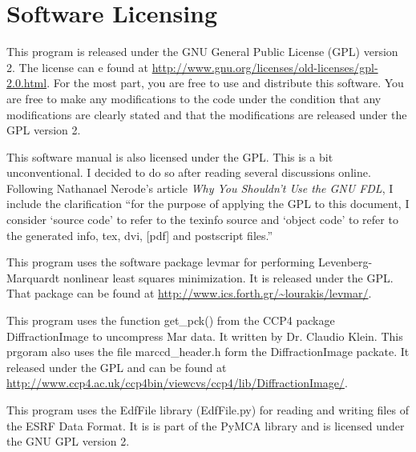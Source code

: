 \chapter{Software Licensing}

This program is released under the GNU General
Public License (GPL) version 2.
The license can e found at 
\url{http://www.gnu.org/licenses/old-licenses/gpl-2.0.html}.
For the most part, you are free to use and distribute 
this software. You are free to make any modifications to 
the code under the condition that any modifications are clearly 
stated and that the modifications are released under the 
GPL version 2.

This software manual is also licensed under the GPL. 
This is a bit unconventional. I decided to do so after reading
several discussions online. Following Nathanael Nerode's 
article {\em Why You Shouldn't Use the GNU FDL}, I include 
the clarification ``for the purpose of applying the GPL to 
this document, I consider `source code' to refer to the texinfo 
source and `object code' to refer to the generated info, tex, 
dvi, [pdf] and postscript files.''\cite{Nerode03}

This program uses the software package
levmar for performing Levenberg-Marquardt nonlinear
least squares minimization.
It is released under the GPL. That package can be 
found at \url{http://www.ics.forth.gr/~lourakis/levmar/}.\cite{lourakis04LM}

This program uses the function get\_pck() from the CCP4 package
DiffractionImage to uncompress Mar data. It
written by Dr. Claudio Klein.\cite{Klein95} 
This prgoram also uses the file marccd\_header.h form
the DiffractionImage packate. It
released under the GPL and can be found at
\url{http://www.ccp4.ac.uk/ccp4bin/viewcvs/ccp4/lib/DiffractionImage/}.\cite{DiffractionImage}

This program uses the EdfFile library (EdfFile.py) for reading and 
writing files of the ESRF Data Format. It is is part of the PyMCA 
library and is licensed under the GNU GPL version 2.\cite{PyMCA}

